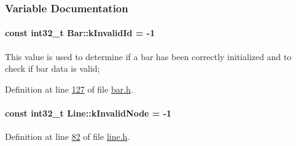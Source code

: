 \subsubsection{Variable Documentation}
\hypertarget{group___models_ga9919592c0397ed41448dfb20b607d738}{}
\paragraph[{k\+Invalid\+Id}]{\setlength{\rightskip}{0pt plus 5cm}const int32\+\_\+t Bar\+::k\+Invalid\+Id = -\/1\hspace{0.3cm}{\ttfamily [static]}}\label{group___models_ga9919592c0397ed41448dfb20b607d738}
This value is used to determine if a bar has been correctly initialized and to check if bar data is valid; 

Definition at line \hyperlink{bar_8h_source_l00127}{127} of file \hyperlink{bar_8h_source}{bar.\+h}.

\hypertarget{group___models_gadc334bd07c6126abc56e531d7e3e72b4}{}
\paragraph[{k\+Invalid\+Node}]{\setlength{\rightskip}{0pt plus 5cm}const int32\+\_\+t Line\+::k\+Invalid\+Node = -\/1\hspace{0.3cm}{\ttfamily [static]}}\label{group___models_gadc334bd07c6126abc56e531d7e3e72b4}


Definition at line \hyperlink{line_8h_source_l00082}{82} of file \hyperlink{line_8h_source}{line.\+h}.

